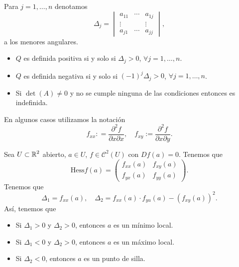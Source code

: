 \begin{theorem}
Para $\displaystyle j = 1, \ldots, n $ denotamos 
\[\Delta_{j} = \begin{vmatrix} a_{11} & \cdots & a_{1j} \\ \vdots & & \vdots \\ a_{j1} & \cdots & a_{jj} \end{vmatrix}  ,\]
a los menores angulares. 
\begin{itemize}
\item $\displaystyle Q $ es definida positiva si y solo si $\displaystyle \Delta_{j} > 0 $, $\displaystyle \forall j = 1, \ldots, n $. 
\item $\displaystyle Q $ es definida negativa si y solo si $\displaystyle \left(-1\right)^{j}\Delta _{j} > 0 $, $\displaystyle \forall j = 1, \ldots, n $. 
\item Si $\displaystyle \det\left(A\right) \neq 0 $ y no se cumple ninguna de las condiciones entonces es indefinida. 
\end{itemize}
\end{theorem}
\begin{notation}
En algunos casos utilizamos la notación
\[f_{x x} : = \frac{\partial^{2}f}{\partial x \partial x}, \quad f_{xy} := \frac{\partial^{2}f}{\partial x\partial y} .\]
\end{notation}
\begin{eg}
Sea $\displaystyle U \subset \mathbb{R}^{2} $ abierto, $\displaystyle a \in U $, $\displaystyle f \in \mathcal{C}^{2}\left(U\right) $ con $\displaystyle Df\left(a\right) = 0 $. Tenemos que 
\[\text{Hess}f\left(a\right) =\begin{pmatrix} f_{x x }\left(a\right) & f_{xy}\left(a\right) \\ f_{yx}\left(a\right) & f_{yy}\left(a\right) \end{pmatrix} .\]
Tenemos que
\[\Delta_{1} = f_{x x}\left(a\right), \quad \Delta_{2} = f_{ x x}\left(a\right) \cdot f_{yu}\left(a\right)- \left(f_{xy}\left(a\right)\right)^{2}.\]
Así, tenemos que 
\begin{itemize}
\item Si $\displaystyle \Delta_{1} > 0 $ y $\displaystyle \Delta_{2}> 0 $, entonces $\displaystyle a $ es un mínimo local. 
\item Si $\displaystyle \Delta_{1} < 0 $ y $\displaystyle \Delta_{2} > 0 $, entonces $\displaystyle a $ es un máximo local. 
\item Si $\displaystyle \Delta_{2} < 0$, entonces $\displaystyle a $ es un punto de silla.
\end{itemize}
\end{eg}
